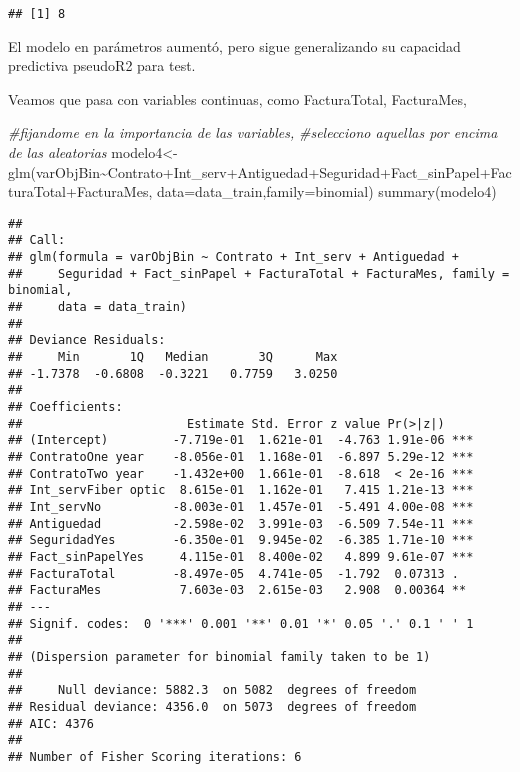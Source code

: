 \documentclass[
]{article}
\newenvironment{Shaded}{\begin{snugshade}}{\end{snugshade}}
\newcommand{\AttributeTok}[1]{\textcolor[rgb]{0.77,0.63,0.00}{#1}}
\newcommand{\CommentTok}[1]{\textcolor[rgb]{0.56,0.35,0.01}{\textit{#1}}}
\newcommand{\FunctionTok}[1]{\textcolor[rgb]{0.00,0.00,0.00}{#1}}
\newcommand{\NormalTok}[1]{#1}
\newcommand{\OtherTok}[1]{\textcolor[rgb]{0.56,0.35,0.01}{#1}}
\newcommand{\SpecialCharTok}[1]{\textcolor[rgb]{0.00,0.00,0.00}{#1}}
\begin{document}
\begin{verbatim}
## [1] 8
\end{verbatim}

El modelo en parámetros aumentó, pero sigue generalizando su capacidad
predictiva pseudoR2 para test.

Veamos que pasa con variables continuas, como FacturaTotal, FacturaMes,

\begin{Shaded}
\begin{Highlighting}[]
\CommentTok{\#fijandome en la importancia de las variables, }
\CommentTok{\#selecciono aquellas por encima de las aleatorias}
\NormalTok{modelo4}\OtherTok{\textless{}{-}}\FunctionTok{glm}\NormalTok{(varObjBin}\SpecialCharTok{\textasciitilde{}}\NormalTok{Contrato}\SpecialCharTok{+}\NormalTok{Int\_serv}\SpecialCharTok{+}\NormalTok{Antiguedad}\SpecialCharTok{+}\NormalTok{Seguridad}\SpecialCharTok{+}\NormalTok{Fact\_sinPapel}\SpecialCharTok{+}\NormalTok{FacturaTotal}\SpecialCharTok{+}\NormalTok{FacturaMes,}
             \AttributeTok{data=}\NormalTok{data\_train,}\AttributeTok{family=}\NormalTok{binomial)}
\FunctionTok{summary}\NormalTok{(modelo4)}
\end{Highlighting}
\end{Shaded}

\begin{verbatim}
## 
## Call:
## glm(formula = varObjBin ~ Contrato + Int_serv + Antiguedad + 
##     Seguridad + Fact_sinPapel + FacturaTotal + FacturaMes, family = binomial, 
##     data = data_train)
## 
## Deviance Residuals: 
##     Min       1Q   Median       3Q      Max  
## -1.7378  -0.6808  -0.3221   0.7759   3.0250  
## 
## Coefficients:
##                       Estimate Std. Error z value Pr(>|z|)    
## (Intercept)         -7.719e-01  1.621e-01  -4.763 1.91e-06 ***
## ContratoOne year    -8.056e-01  1.168e-01  -6.897 5.29e-12 ***
## ContratoTwo year    -1.432e+00  1.661e-01  -8.618  < 2e-16 ***
## Int_servFiber optic  8.615e-01  1.162e-01   7.415 1.21e-13 ***
## Int_servNo          -8.003e-01  1.457e-01  -5.491 4.00e-08 ***
## Antiguedad          -2.598e-02  3.991e-03  -6.509 7.54e-11 ***
## SeguridadYes        -6.350e-01  9.945e-02  -6.385 1.71e-10 ***
## Fact_sinPapelYes     4.115e-01  8.400e-02   4.899 9.61e-07 ***
## FacturaTotal        -8.497e-05  4.741e-05  -1.792  0.07313 .  
## FacturaMes           7.603e-03  2.615e-03   2.908  0.00364 ** 
## ---
## Signif. codes:  0 '***' 0.001 '**' 0.01 '*' 0.05 '.' 0.1 ' ' 1
## 
## (Dispersion parameter for binomial family taken to be 1)
## 
##     Null deviance: 5882.3  on 5082  degrees of freedom
## Residual deviance: 4356.0  on 5073  degrees of freedom
## AIC: 4376
## 
## Number of Fisher Scoring iterations: 6
\end{verbatim}
\end{document}
